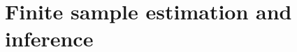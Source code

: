 \documentclass[table, xcolor = {dvipsnames}, 9pt]{beamer}
\theoremstyle{plain}
\begin{document}
\section{\large Finite sample estimation and inference}
\end{document}
